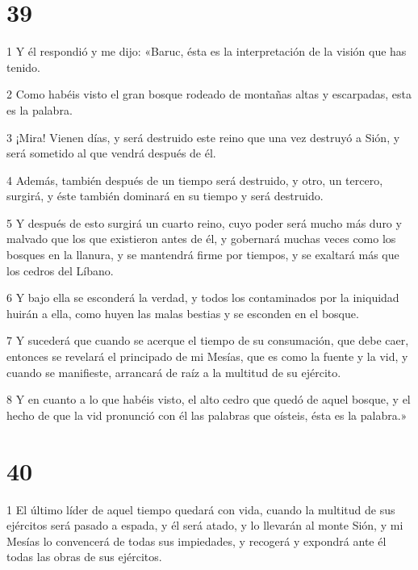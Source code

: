 \chapter{39}

\par 1 Y él respondió y me dijo: «Baruc, ésta es la interpretación de la visión que has tenido.

\par 2 Como habéis visto el gran bosque rodeado de montañas altas y escarpadas, esta es la palabra.

\par 3 ¡Mira! Vienen días, y será destruido este reino que una vez destruyó a Sión, y será sometido al que vendrá después de él.

\par 4 Además, también después de un tiempo será destruido, y otro, un tercero, surgirá, y éste también dominará en su tiempo y será destruido.

\par 5 Y después de esto surgirá un cuarto reino, cuyo poder será mucho más duro y malvado que los que existieron antes de él, y gobernará muchas veces como los bosques en la llanura, y se mantendrá firme por tiempos, y se exaltará más que los cedros del Líbano.

\par 6 Y bajo ella se esconderá la verdad, y todos los contaminados por la iniquidad huirán a ella, como huyen las malas bestias y se esconden en el bosque.

\par 7 Y sucederá que cuando se acerque el tiempo de su consumación, que debe caer, entonces se revelará el principado de mi Mesías, que es como la fuente y la vid, y cuando se manifieste, arrancará de raíz a la multitud de su ejército.

\par 8 Y en cuanto a lo que habéis visto, el alto cedro que quedó de aquel bosque, y el hecho de que la vid pronunció con él las palabras que oísteis, ésta es la palabra.»

\chapter{40}

\par 1 El último líder de aquel tiempo quedará con vida, cuando la multitud de sus ejércitos será pasado a espada, y él será atado, y lo llevarán al monte Sión, y mi Mesías lo convencerá de todas sus impiedades, y recogerá y expondrá ante él todas las obras de sus ejércitos.

